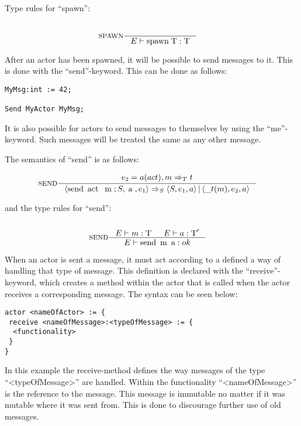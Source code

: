 Type rules for \enquote{spawn}:

\begin{align*}
\intertext{}
&\inference[SPAWN]{}
                 {\Tenv \mathbin{\text{spawn}} \; \Tt: \Tt}
\end{align*}

After an actor has been spawned, it will be possible to send messages to it. This is done with the \enquote{send}-keyword. This can be done as follows:

\label{actorfuncSend}
\begin{lstlisting}
MyMsg:int := 42;

Send MyActor MyMsg;
\end{lstlisting}

It is also possible for actors to send messages to themselves by using the \enquote{me}-keyword. Such messages will be treated the same as any other message.

The semantics of \enquote{send} is as follows:

\begin{align*}
&\inference[$\text{SEND}$]{e_2 = a(act),m \Rightarrow_T t}
                       {\Braket{\Tsend \Tact \Tm ; S,\Ta,e_1} \Rightarrow_S \Braket{S,e_1,a}|\Braket{\_t(m),e_2,a}}
\end{align*}

and the type rules for \enquote{send}:

\begin{align*}
\intertext{}
&\inference[SEND]{\Tenv m : \Tt & \Tenv a: \Tt'}
                 {\Tenv \mathbin{\text{send}} \; \mathbin{\text{m}} \; \mathbin{\text{a}} : ok }
\end{align*}

When an actor is sent a message, it must act according to a defined a way of handling that type of message. This definition is declared with the \enquote{receive}-keyword, which creates a method within the actor that is called when the actor receives a corresponding message. The syntax can be seen below:

\label{actorfuncReceive}
\begin{lstlisting}
actor <nameOfActor> := {
 receive <nameOfMessage>:<typeOfMessage> := {
  <functionality>
 }
}
\end{lstlisting}

In this example the receive-method defines the way messages of the type \enquote{<typeOfMessage>} are handled. Within the functionality \enquote{<nameOfMessage>} is the reference to the message. This message is immutable no matter if it was mutable where it was sent from. This is done to discourage further use of old messages.

